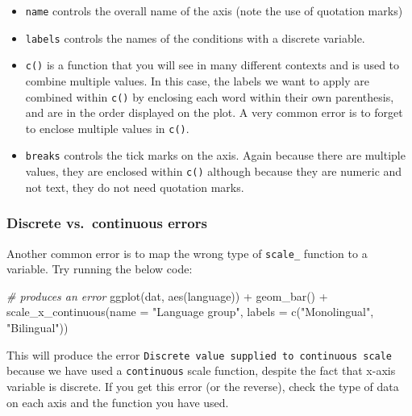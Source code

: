 \documentclass[
  english,
  doc,floatsintext]{apa6}
\newenvironment{Shaded}{\begin{snugshade}}{\end{snugshade}}
\newcommand{\AttributeTok}[1]{\textcolor[rgb]{0.77,0.63,0.00}{#1}}
\newcommand{\CommentTok}[1]{\textcolor[rgb]{0.56,0.35,0.01}{\textit{#1}}}
\newcommand{\FunctionTok}[1]{\textcolor[rgb]{0.00,0.00,0.00}{#1}}
\newcommand{\NormalTok}[1]{#1}
\newcommand{\SpecialCharTok}[1]{\textcolor[rgb]{0.00,0.00,0.00}{#1}}
\newcommand{\StringTok}[1]{\textcolor[rgb]{0.31,0.60,0.02}{#1}}
\begin{document}
\begin{itemize}
\item
  \texttt{name} controls the overall name of the axis (note the use of quotation marks)
\item
  \texttt{labels} controls the names of the conditions with a discrete variable.
\item
  \texttt{c()} is a function that you will see in many different contexts and is used to combine multiple values. In this case, the labels we want to apply are combined within \texttt{c()} by enclosing each word within their own parenthesis, and are in the order displayed on the plot. A very common error is to forget to enclose multiple values in \texttt{c()}.
\item
  \texttt{breaks} controls the tick marks on the axis. Again because there are multiple values, they are enclosed within \texttt{c()} although because they are numeric and not text, they do not need quotation marks.
\end{itemize}

\hypertarget{discrete-vs.-continuous-errors}{%
\subsubsection{Discrete vs.~continuous errors}\label{discrete-vs.-continuous-errors}}

Another common error is to map the wrong type of \texttt{scale\_} function to a variable. Try running the below code:

\begin{Shaded}
\begin{Highlighting}[]
\CommentTok{\# produces an error}
\FunctionTok{ggplot}\NormalTok{(dat, }\FunctionTok{aes}\NormalTok{(language)) }\SpecialCharTok{+}
  \FunctionTok{geom\_bar}\NormalTok{() }\SpecialCharTok{+}
  \FunctionTok{scale\_x\_continuous}\NormalTok{(}\AttributeTok{name =} \StringTok{"Language group"}\NormalTok{, }
                   \AttributeTok{labels =} \FunctionTok{c}\NormalTok{(}\StringTok{"Monolingual"}\NormalTok{, }\StringTok{"Bilingual"}\NormalTok{)) }
\end{Highlighting}
\end{Shaded}

This will produce the error \texttt{Discrete\ value\ supplied\ to\ continuous\ scale} because we have used a \texttt{continuous} scale function, despite the fact that x-axis variable is discrete. If you get this error (or the reverse), check the type of data on each axis and the function you have used.
\end{document}
